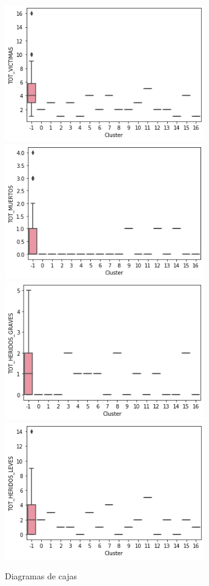 \documentclass[a4]{article}
\begin{document}
\begin{figure}[H]
  \centering
  \caption{Diagramas de cajas}
  \includegraphics[width=87mm]{imagenes/c1_dbscan_vic}
  \includegraphics[width=87mm]{imagenes/c1_dbscan_muertos}
    \includegraphics[width=87mm]{imagenes/c1_dbscan_hg}
  \includegraphics[width=87mm]{imagenes/c1_dbscan_hl}

\end{figure}
\end{document}

